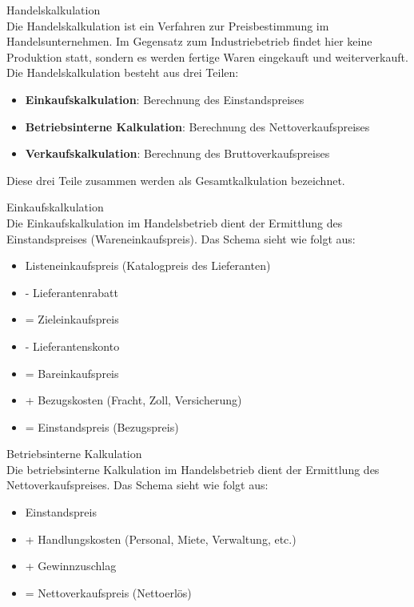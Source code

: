 \begin{definition}{Handelskalkulation}\\
Die Handelskalkulation ist ein Verfahren zur Preisbestimmung im Handelsunternehmen. Im Gegensatz zum Industriebetrieb findet hier keine Produktion statt, sondern es werden fertige Waren eingekauft und weiterverkauft. Die Handelskalkulation besteht aus drei Teilen:
\begin{itemize}
    \item \textbf{Einkaufskalkulation}: Berechnung des Einstandspreises
    \item \textbf{Betriebsinterne Kalkulation}: Berechnung des Nettoverkaufspreises
    \item \textbf{Verkaufskalkulation}: Berechnung des Bruttoverkaufspreises
\end{itemize}

Diese drei Teile zusammen werden als Gesamtkalkulation bezeichnet.
\end{definition}

\begin{definition}{Einkaufskalkulation}\\
Die Einkaufskalkulation im Handelsbetrieb dient der Ermittlung des Einstandspreises (Wareneinkaufspreis). Das Schema sieht wie folgt aus:
\begin{itemize}
    \item Listeneinkaufspreis (Katalogpreis des Lieferanten)
    \item - Lieferantenrabatt
    \item = Zieleinkaufspreis
    \item - Lieferantenskonto
    \item = Bareinkaufspreis
    \item + Bezugskosten (Fracht, Zoll, Versicherung)
    \item = Einstandspreis (Bezugspreis)
\end{itemize}
\end{definition}

\begin{definition}{Betriebsinterne Kalkulation}\\
Die betriebsinterne Kalkulation im Handelsbetrieb dient der Ermittlung des Nettoverkaufspreises. Das Schema sieht wie folgt aus:
\begin{itemize}
    \item Einstandspreis
    \item + Handlungskosten (Personal, Miete, Verwaltung, etc.)
    \item + Gewinnzuschlag
    \item = Nettoverkaufspreis (Nettoerlös)
\end{itemize}
\end{definition}

